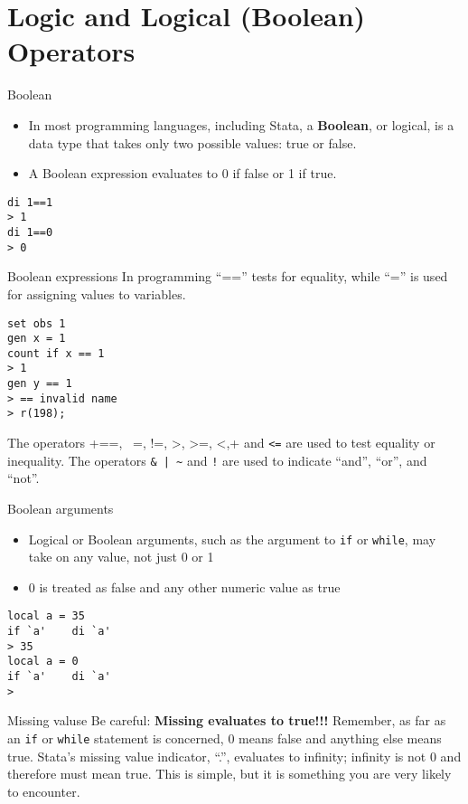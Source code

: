 \documentclass[fleqn, handout, 10pt]{beamer}
\def\lst{\lstinline}
\begin{document}
\section{Logic and Logical (Boolean) Operators}

\begin{frame}[fragile]{Boolean}
    \begin{itemize}
        \item In most programming languages, including Stata, a \textbf{Boolean}, or logical, is a data type that takes only two possible values: true or false.
        \item A Boolean expression evaluates to 0 if false or 1 if true.
    \end{itemize}\pause
    \begin{lstlisting}
di 1==1
> 1
di 1==0
> 0
    \end{lstlisting}
\end{frame}

\begin{frame}[fragile]{Boolean expressions}
    In programming ``=='' tests for equality, while ``='' is used for assigning values to variables. \pause
    \begin{lstlisting}
set obs 1
gen x = 1
count if x == 1
> 1
gen y == 1
> == invalid name
> r(198);
	    \end{lstlisting}
\pause
    The operators +==, ~=, !=, >, >=, <,+ and \lst+<=+ are used to test equality or inequality. The operators \lst+& | ~+ and \lst+!+ are used to indicate ``and'', ``or'', and ``not''.
\end{frame}

\begin{frame}[fragile]{Boolean arguments}
    \begin{itemize}
        \item Logical or Boolean arguments, such as the argument to \lst=if= or \lst=while=, may take on any value, not just 0 or 1
        \item 0 is treated as false and any other numeric value as true
    \end{itemize} \pause
    \begin{lstlisting}
local a = 35
if `a'    di `a'
> 35
local a = 0
if `a'    di `a'
>
    \end{lstlisting}
\end{frame}

\begin{frame}{Missing valuse}
    Be careful: \textbf{Missing evaluates to true!!!} Remember, as far as an \lst=if= or \lst=while= statement is concerned, 0 means false and anything else means true. Stata's missing value indicator, ``.'', evaluates to infinity; infinity is not 0 and therefore must mean true. This is simple, but it is something you are very likely to encounter.
\end{frame}
\end{document}
